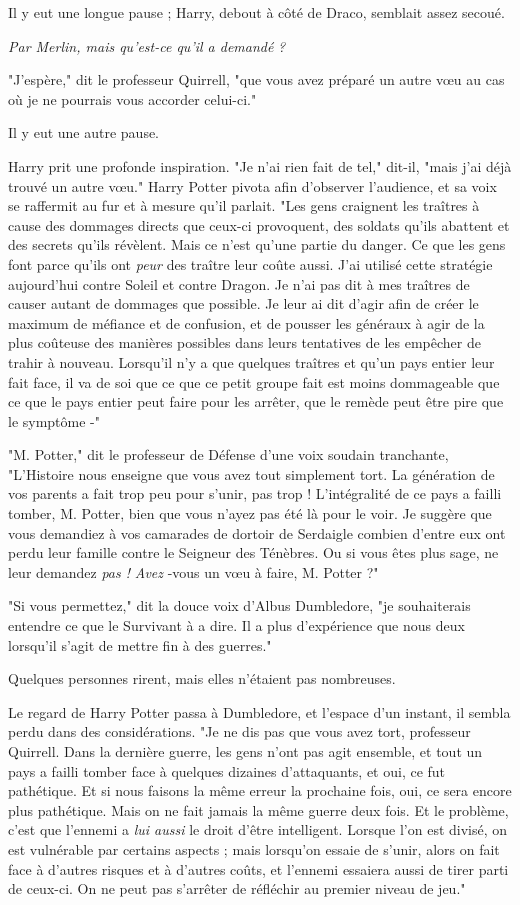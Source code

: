 Il y eut une longue pause ; Harry, debout à côté de Draco, semblait assez secoué.

\emph{Par Merlin, mais qu'est-ce qu'il a demandé}  \emph{?} 

"J'espère," dit le professeur Quirrell, "que vous avez préparé un autre vœu au cas où je ne pourrais vous accorder celui-ci."

Il y eut une autre pause.

Harry prit une profonde inspiration. "Je n'ai rien fait de tel," dit-il, "mais j'ai déjà trouvé un autre vœu." Harry Potter pivota afin d'observer l'audience, et sa voix se raffermit au fur et à mesure qu'il parlait. "Les gens craignent les traîtres à cause des dommages directs que ceux-ci provoquent, des soldats qu'ils abattent et des secrets qu'ils révèlent. Mais ce n'est qu'une partie du danger. Ce que les gens font parce qu'ils ont \emph{peur}  des traître leur coûte aussi. J'ai utilisé cette stratégie aujourd'hui contre Soleil et contre Dragon. Je n'ai pas dit à mes traîtres de causer autant de dommages que possible. Je leur ai dit d'agir afin de créer le maximum de méfiance et de confusion, et de pousser les généraux à agir de la plus coûteuse des manières possibles dans leurs tentatives de les empêcher de trahir à nouveau. Lorsqu'il n'y a que quelques traîtres et qu'un pays entier leur fait face, il va de soi que ce que ce petit groupe fait est moins dommageable que ce que le pays entier peut faire pour les arrêter, que le remède peut être pire que le symptôme -"

"M. Potter," dit le professeur de Défense d'une voix soudain tranchante, "L'Histoire nous enseigne que vous avez tout simplement tort. La génération de vos parents a fait trop peu pour s'unir, pas trop ! L'intégralité de ce pays a failli tomber, M. Potter, bien que vous n'ayez pas été là pour le voir. Je suggère que vous demandiez à vos camarades de dortoir de Serdaigle combien d'entre eux ont perdu leur famille contre le Seigneur des Ténèbres. Ou si vous êtes plus sage, ne leur demandez \emph{pas !}  \emph{Avez} -vous un vœu à faire, M. Potter ?"

"Si vous permettez," dit la douce voix d'Albus Dumbledore, "je souhaiterais entendre ce que le Survivant à a dire. Il a plus d'expérience que nous deux lorsqu'il s'agit de mettre fin à des guerres."

Quelques personnes rirent, mais elles n'étaient pas nombreuses.

Le regard de Harry Potter passa à Dumbledore, et l'espace d'un instant, il sembla perdu dans des considérations. "Je ne dis pas que vous avez tort, professeur Quirrell. Dans la dernière guerre, les gens n'ont pas agit ensemble, et tout un pays a failli tomber face à quelques dizaines d'attaquants, et oui, ce fut pathétique. Et si nous faisons la même erreur la prochaine fois, oui, ce sera encore plus pathétique. Mais on ne fait jamais la même guerre deux fois. Et le problème, c'est que l'ennemi a \emph{lui aussi}  le droit d'être intelligent. Lorsque l'on est divisé, on est vulnérable par certains aspects ; mais lorsqu'on essaie de s'unir, alors on fait face à d'autres risques et à d'autres coûts, et l'ennemi essaiera aussi de tirer parti de ceux-ci. On ne peut pas s'arrêter de réfléchir au premier niveau de jeu."

